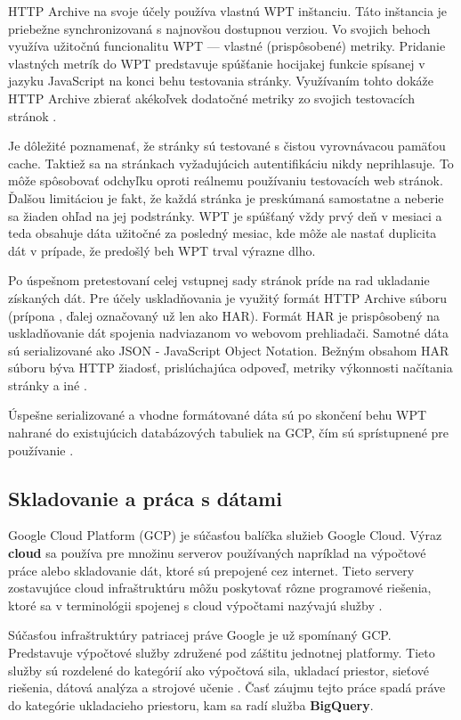 HTTP Archive na svoje účely používa vlastnú WPT inštanciu. 
Táto inštancia je priebežne synchronizovaná s najnovšou dostupnou verziou.
Vo svojich behoch využíva užitočnú funcionalitu WPT --- vlastné (prispôsobené) metriky.
Pridanie vlastných metrík do WPT predstavuje spúšťanie hocijakej funkcie spísanej v jazyku JavaScript na konci behu testovania stránky. 
Využívaním tohto dokáže HTTP Archive zbierať akékoľvek dodatočné metriky zo svojich testovacích stránok \cite{webpagetest}.

Je dôležité poznamenať, že stránky sú testované s čistou vyrovnávacou pamäťou cache. Taktiež sa na stránkach vyžadujúcich autentifikáciu nikdy neprihlasuje.
To môže spôsobovať odchyľku oproti reálnemu používaniu testovacích web stránok. Ďalšou limitáciou je fakt, že každá stránka je preskúmaná samostatne a neberie sa žiaden ohľad na jej podstránky.
WPT je spúšťaný vždy prvý deň v mesiaci a teda obsahuje dáta užitočné za posledný mesiac, kde môže ale nastať duplicita dát v prípade, že predošlý beh WPT trval výrazne dlho.

Po úspešnom pretestovaní celej vstupnej sady stránok príde na rad ukladanie získaných dát.
Pre účely uskladňovania je využitý formát HTTP Archive súboru (prípona , ďalej označovaný už len ako HAR).
Formát HAR je prispôsobený na uskladňovanie dát spojenia nadviazanom vo webovom prehliadači. Samotné dáta sú serializované ako JSON - JavaScript Object Notation.
Bežným obsahom HAR súboru býva HTTP žiadosť, prislúchajúca odpoveď, metriky výkonnosti načítania stránky a iné \cite{httparchive-harfile}.

Úspešne serializované a vhodne formátované dáta sú po skončení behu WPT nahrané do existujúcich databázových tabuliek na GCP, čím sú sprístupnené pre používanie \cite{httparchive-faq}. 

\subsection{Skladovanie a práca s dátami}
Google Cloud Platform (GCP) je súčasťou balíčka služieb Google Cloud. 
Výraz \textbf{cloud} sa používa pre množinu serverov používaných napríklad na výpočtové práce alebo skladovanie dát, ktoré sú prepojené cez internet.
Tieto servery zostavujúce cloud infraštruktúru môžu poskytovať rôzne programové riešenia, ktoré sa v terminológii spojenej s cloud výpočtami nazývajú služby \cite{cloudflare-clouddefinition}.

Súčasťou infraštruktúry patriacej práve Google je už spomínaný GCP. Predstavuje výpočtové služby združené pod záštitu jednotnej platformy.
Tieto služby sú rozdelené do kategórií ako výpočtová sila, ukladací priestor, sieťové riešenia, dátová analýza a strojové učenie \cite{gfg-gcp}.
Časť záujmu tejto práce spadá práve do kategórie ukladacieho priestoru, kam sa radí služba \textbf{BigQuery}.

